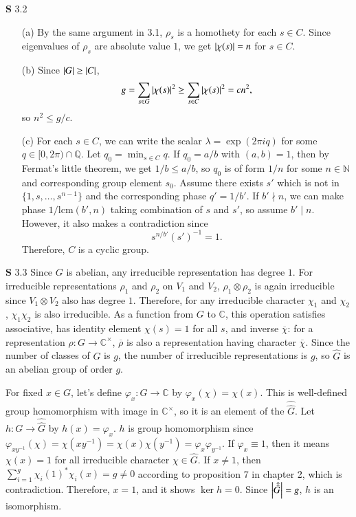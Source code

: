 \documentclass[a4paper, 12pt]{article}
\theoremstyle{Mydefinition}
\theoremstyle{Mytheorem}
\begin{document}
\noindent \textbf{S} 3.2
\begin{enumerate}
    \item[(a)] By the same argument in 3.1, $\rho_s$ is a homothety for each $s\in C$. Since eigenvalues of $\rho_s$ are absolute value $1$, we get $\abs{\chi(s)} = n$ for $s\in C$.
    \item[(b)] Since $\abs{G}\geq \abs{C}$,
    \begin{equation}
        g = \sum_{s\in G}\abs{\chi(s)}^2\geq \sum_{s\in C}\abs{\chi(s)}^2 = cn^2,
    \end{equation}
    so $n^2\leq g/c$.
    \item[(c)] For each $s\in C$, we can write the scalar $\lambda = \exp(2\pi i q)$ for some $q\in [0,2\pi)\cap \mathbb{Q}$. Let $q_0 = \min_{s\in C}q$. If $q_0=a/b$ with $(a,b)=1$, then by Fermat's little theorem, we get $1/b\leq a/b$, so $q_0$ is of form $1/n$ for some $n\in\mathbb{N}$ and corresponding group element $s_0$. Assume there exists $s'$ which is not in $\{1, s, \ldots, s^{n-1}\}$ and the corresponding phase $q'=1/b'$. If $b'\nmid n$, we can make phase $1/\mathrm{lcm}(b', n)$ taking combination of $s$ and $s'$, so assume $b'\mid n$. However, it also makes a contradiction since
    \begin{equation}
        s^{n/b'}(s')^{-1} = 1.
    \end{equation}
    Therefore, $C$ is a cyclic group.
\end{enumerate}
    
\noindent \textbf{S} 3.3
Since $G$ is abelian, any irreducible representation has degree $1$. For irreducible representations $\rho_1$ and $\rho_2$ on $V_1$ and $V_2$, $\rho_1\otimes \rho_2$ is again irreducible since $V_1\otimes V_2$ also has degree $1$. Therefore, for any irreducible character $\chi_1$ and $\chi_2$, $\chi_1\chi_2$ is also irreducible. As a function from $G$ to $\mathbb{C}$, this operation satisfies associative, has identity element $\chi(s) = 1$ for all $s$, and inverse $\overline{\chi}$: for a representation $\rho:G\rightarrow \mathbb{C}^\times$, $\overline{\rho}$ is also a representation having character $\overline{\chi}$. Since the number of classes of $G$ is $g$, the number of irreducible representations is $g$, so $\hat{G}$ is an abelian group of order $g$.

For fixed $x\in G$, let's define $\varphi_x:\hat{G}\rightarrow \mathbb{C}$ by $\varphi_x(\chi) = \chi(x)$. This is well-defined group homomorphism with image in $\mathbb{C}^\times$, so it is an element of the $\hat{\hat{G}}$. Let $h:G\rightarrow \hat{\hat{G}}$ by $h(x) = \varphi_x$. $h$ is group homomorphism since $\varphi_{xy^{-1}}(\chi) = \chi(xy^{-1}) = \chi(x)\chi(y^{-1}) = \varphi_x\varphi_{y^{-1}}$. If $\varphi_x \equiv 1$, then it means $\chi(x) = 1$ for all irreducible character $\chi\in \hat{G}$. If $x\neq 1$, then $\sum_{i=1}^g\chi_i(1)^*\chi_i(x) = g\neq 0$ according to proposition 7 in chapter 2, which is contradiction. Therefore, $x=1$, and it shows $\ker h = 0$. Since $\abs{\hat{\hat{G}}}=g$, $h$ is an isomorphism.
\end{document}
